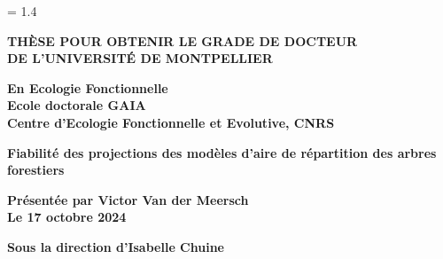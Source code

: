 \begin{titlepage}

\selectfont

  \newpage
  

  
  \AddToShipoutPicture*{\BackgroundIm}

  \let\footnotesize\small
  \let\footnoterule\relax
  \let \footnote \thanks

  \baselineskip = 1.4\baselineskip

  \begin{center}
  \setcounter{page}{1}
  
  \textbf{\textcolor{um-red}{\LARGE {THÈSE POUR OBTENIR LE GRADE DE DOCTEUR} \\
  \LARGE{DE L'UNIVERSITÉ DE MONTPELLIER} \\ }}
  
  \vspace*{\baselineskip} 
  \large{\textbf{En Ecologie Fonctionnelle}} \\
  \vspace*{\medskipamount} 
  \large{\textbf{Ecole doctorale GAIA}} \\
  \vspace*{\medskipamount}
  \large{\textbf{Centre d'Ecologie Fonctionnelle et Evolutive, CNRS}} \\
  \vspace*{2.5cm}
  
  \textcolor{um-gray}{\LARGE{\textbf{Fiabilité des projections des modèles d'aire de répartition des arbres forestiers}} \\ }
  \vspace*{2cm}
  
  \Large{\textbf{Présentée par Victor Van der Meersch}} \\
  \Large{\textbf{Le 17 octobre 2024}} \\
  \vspace*{\baselineskip}
  
  \large{\textbf{Sous la direction d'Isabelle Chuine}} \\
  \vspace*{\fill}
  

\end{center}
\end{titlepage}
